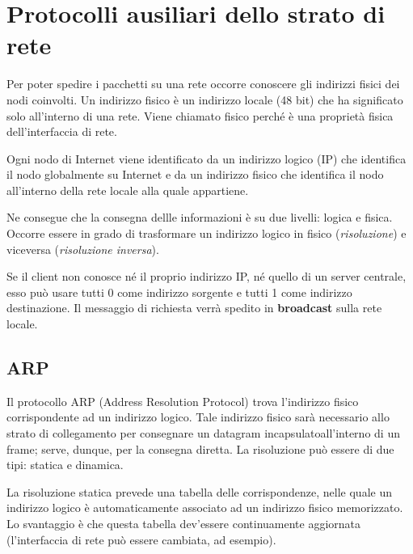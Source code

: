 \section{Protocolli ausiliari dello strato di rete}

    Per poter spedire i pacchetti su una rete occorre conoscere gli indirizzi fisici dei nodi coinvolti. Un indirizzo fisico è un indirizzo locale (48 bit) che ha significato solo all'interno di una rete. Viene chiamato fisico perché è una proprietà fisica dell'interfaccia di rete.
    
    \vspace{3mm}
    
    Ogni nodo di Internet viene identificato da un indirizzo logico (IP) che identifica il nodo globalmente su Internet e da un indirizzo fisico che identifica il nodo all'interno della rete locale alla quale appartiene.
    
    Ne consegue che la consegna dellle informazioni è su due livelli: logica e fisica. Occorre essere in grado di trasformare un indirizzo logico in fisico (\textit{risoluzione}) e viceversa (\textit{risoluzione inversa}).
    
    Se il client non conosce né il proprio indirizzo IP, né quello di un server centrale, esso può usare tutti 0 come indirizzo sorgente e tutti 1 come indirizzo destinazione. Il messaggio di richiesta verrà spedito in \textbf{broadcast} sulla rete locale. 
    
    \subsection{ARP}
    
        Il protocollo ARP (Address Resolution Protocol) trova l'indirizzo fisico corrispondente ad un indirizzo logico. Tale indirizzo fisico sarà necessario allo strato di collegamento per consegnare un datagram incapsulatoall'interno di un frame; serve, dunque, per la consegna diretta. La risoluzione può essere di due tipi: statica e dinamica.
        
        \vspace{3mm}
        
        La risoluzione statica prevede una tabella delle corrispondenze, nelle quale un indirizzo logico è automaticamente associato ad un indirizzo fisico memorizzato. Lo svantaggio è che questa tabella dev'essere continuamente aggiornata (l'interfaccia di rete può essere cambiata, ad esempio).
        
        \vspace{3mm}
        
